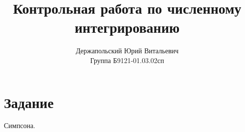 \documentclass[14pt, a4paper, titlepage, fleqn]{extarticle}
\title{Контрольная работа по численному интегрированию}
\author{Держапольский Юрий Витальевич \\ Группа Б9121-01.03.02сп}
\date{}
\begin{document}
    \maketitle

    \section*{Задание}





    Симпсона.
\end{document}

